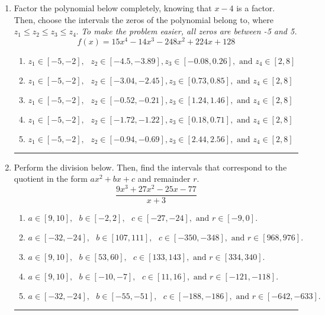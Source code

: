 \documentclass[14pt]{extbook}
\newcommand{\litem}[1]{\item#1\hspace*{-1cm}\rule{\textwidth}{0.4pt}}
\begin{document}
\begin{enumerate}
{\begin{enumerate}[label=\Alph*.]
\end{enumerate} }
\litem{
Factor the polynomial below completely, knowing that $x -4$ is a factor. Then, choose the intervals the zeros of the polynomial belong to, where $z_1 \leq z_2 \leq z_3 \leq z_4$. \textit{To make the problem easier, all zeros are between -5 and 5.}\[ f(x) = 15x^{4} -14 x^{3} -248 x^{2} +224 x + 128 \]\begin{enumerate}[label=\Alph*.]
\item \( z_1 \in [-5, -2], \text{   }  z_2 \in [-4.5, -3.89], z_3 \in [-0.08, 0.26], \text{   and   } z_4 \in [2, 8] \)
\item \( z_1 \in [-5, -2], \text{   }  z_2 \in [-3.04, -2.45], z_3 \in [0.73, 0.85], \text{   and   } z_4 \in [2, 8] \)
\item \( z_1 \in [-5, -2], \text{   }  z_2 \in [-0.52, -0.21], z_3 \in [1.24, 1.46], \text{   and   } z_4 \in [2, 8] \)
\item \( z_1 \in [-5, -2], \text{   }  z_2 \in [-1.72, -1.22], z_3 \in [0.18, 0.71], \text{   and   } z_4 \in [2, 8] \)
\item \( z_1 \in [-5, -2], \text{   }  z_2 \in [-0.94, -0.69], z_3 \in [2.44, 2.56], \text{   and   } z_4 \in [2, 8] \)

\end{enumerate} }
\litem{
Perform the division below. Then, find the intervals that correspond to the quotient in the form $ax^2+bx+c$ and remainder $r$.\[ \frac{9x^{3} +27 x^{2} -25 x -77}{x + 3} \]\begin{enumerate}[label=\Alph*.]
\item \( a \in [9, 10], \text{   } b \in [-2, 2], \text{   } c \in [-27, -24], \text{   and   } r \in [-9, 0]. \)
\item \( a \in [-32, -24], \text{   } b \in [107, 111], \text{   } c \in [-350, -348], \text{   and   } r \in [968, 976]. \)
\item \( a \in [9, 10], \text{   } b \in [53, 60], \text{   } c \in [133, 143], \text{   and   } r \in [334, 340]. \)
\item \( a \in [9, 10], \text{   } b \in [-10, -7], \text{   } c \in [11, 16], \text{   and   } r \in [-121, -118]. \)
\item \( a \in [-32, -24], \text{   } b \in [-55, -51], \text{   } c \in [-188, -186], \text{   and   } r \in [-642, -633]. \)


\end{enumerate}}
\end{enumerate}
\end{document}
